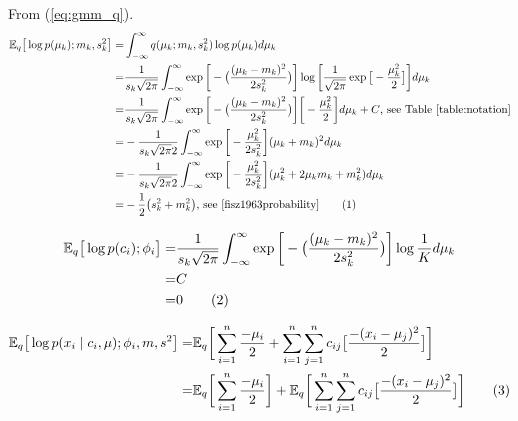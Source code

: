 \documentclass[]{article}
\newcommand{\Expectation} {\mathbb{E}}
\newcommand\numberthis    {\addtocounter{equation}{1}\tag{\theequation}}
\begin{document}
From (\ref{eq:gmm_q}).
\begin{align*}
	 \Expectation_q \big[ \log {p(\mu_k);m_k,s_k^2}\big] =& \int_{-\infty}^{\infty} q(\mu_k;m_k,s_k^2) \log {p(\mu_k)}  d\mu_k\\
	 =& \frac{1}{s_k\sqrt{2\pi}} \int_{-\infty}^{\infty} \exp{\bigg[-\big(\frac{(\mu_k-m_k)^2}{2 s_k^2}\big)\bigg]}\log{\bigg[\frac{1}{\sqrt{2\pi}} \exp{\big[- \frac{\mu_k^2}{2}\big]}\bigg]} d\mu_k\\
	 =&\frac{1}{s_k\sqrt{2\pi}} \int_{-\infty}^{\infty} \exp{\bigg[-\big(\frac{(\mu_k-m_k)^2}{2 s_k^2}\big)\bigg]}\bigg[ - \frac{\mu_k^2}{2}\bigg] d\mu_k+ C \text{, see Table \ref{table:notation}}\\
	 =& - \frac{1}{s_k\sqrt{2\pi} 2 } \int_{-\infty}^{\infty} \exp{\bigg[-\frac{\mu_k^2}{2 s_k^2}\bigg]}(\mu_k+m_k)^2 d\mu_k\\
	 =&- \frac{1}{s_k\sqrt{2\pi} 2 } \int_{-\infty}^{\infty} \exp{\bigg[-\frac{\mu_k^2}{2 s_k^2}\bigg]}(\mu_k^2 +2 \mu_k m_k + m_k^2) d\mu_k\\
	 =&- \frac{1}{2 } \big(s_k^2 +  m_k^2\big) \text{, see  \cite[(5.7.5)]{fisz1963probability}} \numberthis \label{eq:ELBO:1}
\end{align*}

\begin{align*}
	\Expectation_q\big[\log{p(c_i);\phi_i}\big] =& \frac{1}{s_k\sqrt{2\pi}} \int_{-\infty}^{\infty} \exp{\bigg[-\big(\frac{(\mu_k-m_k)^2}{2 s_k^2}\big)\bigg]} \log{\frac{1}{K}} d \mu_k\\
	=& C\\
	=&0 \numberthis \label{eq:ELBO:2}
\end{align*}

\begin{align*}
	\Expectation_q\big[\log{p(x_i\mid c_i,\mu);\phi_i,m,s^2}\big] =& \Expectation_q\bigg[\sum_{i=1}^{n} \frac{-\mu_i}{2}+\sum_{i=1}^{n}\sum_{j=1}^{n} c_{ij}\big[\frac{-(x_i-\mu_j)^2}{2}\big]\bigg]\\
	=&\Expectation_q\bigg[\sum_{i=1}^{n} \frac{-\mu_i}{2}\bigg]+\Expectation_q\bigg[\sum_{i=1}^{n}\sum_{j=1}^{n} c_{ij}\big[\frac{-(x_i-\mu_j)^2}{2}\big]\bigg] \numberthis \label{eq:ELBO:3}
\end{align*}
\end{document}
